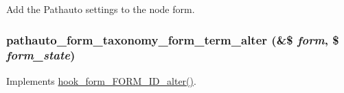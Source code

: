 Add the Pathauto settings to the node form. \hypertarget{pathauto_8module_aa7283f26358021e712eed8d287d1799d}{
\subsubsection[{pathauto\_\-form\_\-taxonomy\_\-form\_\-term\_\-alter}]{\setlength{\rightskip}{0pt plus 5cm}pathauto\_\-form\_\-taxonomy\_\-form\_\-term\_\-alter (\&\$ {\em form}, \/  \$ {\em form\_\-state})}}
\label{pathauto_8module_aa7283f26358021e712eed8d287d1799d}
Implements \hyperlink{group__hooks_ga8d4a4089551493d55911bd5c4f218264}{hook\_\-form\_\-FORM\_\-ID\_\-alter()}.

